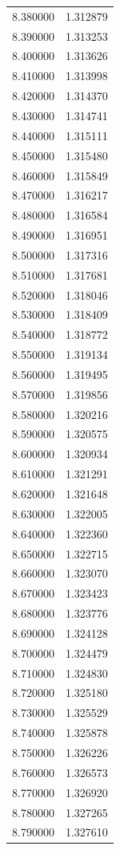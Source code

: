 \begin{tabular}{rr}
8.380000 & 1.312879 \\
8.390000 & 1.313253 \\
8.400000 & 1.313626 \\
8.410000 & 1.313998 \\
8.420000 & 1.314370 \\
8.430000 & 1.314741 \\
8.440000 & 1.315111 \\
8.450000 & 1.315480 \\
8.460000 & 1.315849 \\
8.470000 & 1.316217 \\
8.480000 & 1.316584 \\
8.490000 & 1.316951 \\
8.500000 & 1.317316 \\
8.510000 & 1.317681 \\
8.520000 & 1.318046 \\
8.530000 & 1.318409 \\
8.540000 & 1.318772 \\
8.550000 & 1.319134 \\
8.560000 & 1.319495 \\
8.570000 & 1.319856 \\
8.580000 & 1.320216 \\
8.590000 & 1.320575 \\
8.600000 & 1.320934 \\
8.610000 & 1.321291 \\
8.620000 & 1.321648 \\
8.630000 & 1.322005 \\
8.640000 & 1.322360 \\
8.650000 & 1.322715 \\
8.660000 & 1.323070 \\
8.670000 & 1.323423 \\
8.680000 & 1.323776 \\
8.690000 & 1.324128 \\
8.700000 & 1.324479 \\
8.710000 & 1.324830 \\
8.720000 & 1.325180 \\
8.730000 & 1.325529 \\
8.740000 & 1.325878 \\
8.750000 & 1.326226 \\
8.760000 & 1.326573 \\
8.770000 & 1.326920 \\
8.780000 & 1.327265 \\
8.790000 & 1.327610 \\

\end{tabular}
